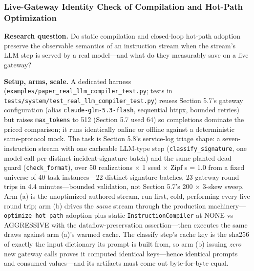 \documentclass[
  sigconf,
  anonymous]{acmart}
\begin{document}
\subsubsection{Live-Gateway Identity Check of Compilation and Hot-Path
Optimization}\label{live-gateway-identity-check-of-compilation-and-hot-path-optimization}

\textbf{Research question.} Do static compilation and closed-loop
hot-path adoption preserve the observable semantics of an instruction
stream when the stream's LLM step is served by a real model---and what
do they measurably save on a live gateway?

\textbf{Setup, arms, scale.} A dedicated harness
(\texttt{examples/paper\_real\_llm\_compiler\_test.py}; tests in
\texttt{tests/system/test\_real\_llm\_compiler\_test.py}) reuses Section
5.7's gateway configuration (alias \texttt{claude-glm-5.3-flash},
sequential httpx, bounded retries) but raises \texttt{max\_tokens} to
512 (Section 5.7 used 64) so completions dominate the priced comparison;
it runs identically online or offline against a deterministic
same-protocol mock. The task is Section 5.8's service-log triage shape:
a seven-instruction stream with one cacheable LLM-type step
(\texttt{classify\_signature}, one model call per distinct
incident-signature batch) and the same planted dead guard
(\texttt{check\_format}), over 50 realizations \(\times\) 1 seed
\(\times\) Zipf s = 1.0 from a fixed universe of 40 task instances---22
distinct signature batches, 23 gateway round trips in 4.4
minutes---bounded validation, not Section 5.7's 200 \(\times\) 3-skew
sweep. Arm (a) is the unoptimized authored stream, run first, cold,
performing every live round trip; arm (b) drives the \emph{same} stream
through the production machinery---\texttt{optimize\_hot\_path} adoption
plus static \texttt{InstructionCompiler} at NONE vs AGGRESSIVE with the
dataflow-preservation assertion---then executes the same draws against
arm (a)'s warmed cache. The classify step's cache key is the sha256 of
exactly the input dictionary its prompt is built from, so arm (b)
issuing \emph{zero} new gateway calls proves it computed identical
keys---hence identical prompts and consumed values---and its artifacts
must come out byte-for-byte equal.
\end{document}
